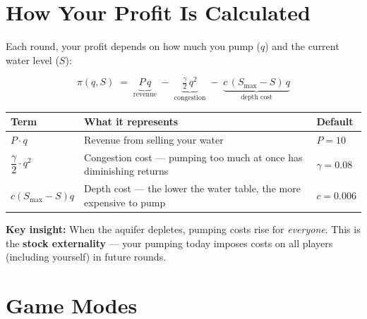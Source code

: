 \documentclass[11pt, letterpaper]{article}
\begin{document}
\section{How Your Profit Is Calculated}

Each round, your profit depends on how much you pump ($q$) and the current water level ($S$):

\begin{infobox}
\[
\pi(q, S) \;=\; \underbrace{P\,q}_{\text{revenue}}
           \;-\; \underbrace{\tfrac{\gamma}{2}\,q^2}_{\text{congestion}}
           \;-\; \underbrace{c\,(S_{\max}-S)\,q}_{\text{depth cost}}
\]
\end{infobox}

\vspace{6pt}

\begin{tabular}{@{}p{4.5cm} p{6.5cm} p{2.5cm}@{}}
\toprule
\textbf{Term} & \textbf{What it represents} & \textbf{Default} \\
\midrule
$P \cdot q$ & Revenue from selling your water & $P = 10$ \\[4pt]
$\dfrac{\gamma}{2} \cdot q^2$ & Congestion cost --- pumping too much at once has diminishing returns & $\gamma = 0.08$ \\[8pt]
$c (S_{\max}-S) q$ & Depth cost --- the lower the water table, the more expensive to pump & $c = 0.006$ \\
\bottomrule
\end{tabular}

\vspace{6pt}

\begin{warnbox}
\textbf{Key insight:} When the aquifer depletes, pumping costs rise for \emph{everyone}. This is the \textbf{stock externality} --- your pumping today imposes costs on all players (including yourself) in future rounds.
\end{warnbox}

\section{Game Modes}
\end{document}
